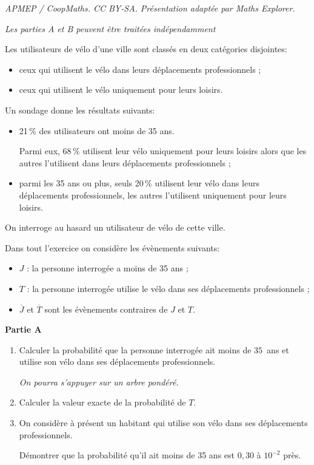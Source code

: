 \documentclass[10pt]{article}
\begin{document}
\noindent\textit{APMEP / CoopMaths. CC BY-SA. Présentation adaptée par Maths Explorer.}\par\medskip
\medskip

\emph{Les parties {\rm A} et {\rm B} peuvent être traitées indépendamment}

\medskip

Les utilisateurs de vélo d'une ville sont classés en deux catégories disjointes:

\begin{itemize}
\item[$\bullet~~$]ceux qui utilisent le vélo dans leurs déplacements professionnels ;
\item[$\bullet~~$]ceux qui utilisent le vélo uniquement pour leurs loisirs.
\end{itemize}

\medskip

Un sondage donne les résultats suivants:

\begin{itemize}
\item[$\bullet~~$]21\,\% des utilisateurs ont moins de 35 ans.

Parmi eux, 68\,\% utilisent leur vélo uniquement pour leurs loisirs alors que les autres l'utilisent dans leurs déplacements professionnels ;
\item[$\bullet~~$]parmi les 35 ans ou plus, seuls 20\,\% utilisent leur vélo dans leurs déplacements professionnels, les autres l'utilisent uniquement pour leurs loisirs.
\end{itemize}

On interroge au hasard un utilisateur de vélo de cette ville.

Dans tout l'exercice on considère les évènements suivants:

\begin{itemize}
\item[$\bullet~~$]$J$ : \og la personne interrogée a moins de 35 ans \fg{} ;
\item[$\bullet~~$]$T$ : \og la personne interrogée utilise le vélo dans ses déplacements professionnels \fg{} ;
\item[$\bullet~~$]$\overline{J}$ et $\overline{T}$ sont les évènements contraires de $J$ et $T$.
\end{itemize}

\bigskip

\textbf{Partie A}

\medskip

\begin{enumerate}
\item Calculer la probabilité que la personne interrogée ait moins de $35$~ans et utilise son vélo dans ses déplacements professionnels.

\emph{On pourra s'appuyer sur un arbre pondéré.}
\item Calculer la valeur exacte de la probabilité de $T$.
\item On considère à présent un habitant qui utilise son vélo dans ses déplacements professionnels.

Démontrer que la probabilité qu'il ait moins de 35 ans est $0,30$ à $10^{-2}$ près.
\end{enumerate}
\end{document}

